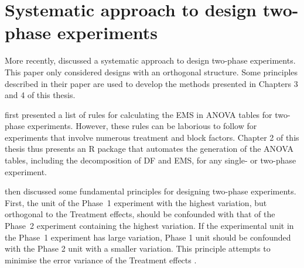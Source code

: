 \section{Systematic approach to design two-phase experiments}
\label{sec:brien2011}
More recently, \cite{Brien2011} discussed a systematic approach to design two-phase experiments. This paper only considered designs with an orthogonal structure. Some principles described in their paper are used to develop the methods presented in Chapters 3 and 4 of this thesis. 

\cite{Brien2011} first presented a list of rules for calculating the EMS in ANOVA tables for two-phase experiments. However, these rules can be laborious to follow for experiments that involve numerous treatment and block factors. Chapter 2 of this thesis thus presents an \textsf{R} package that automates the generation of the ANOVA tables, including the decomposition of DF and EMS, for any single- or two-phase experiment. 

\cite{Brien2011} then discussed some fundamental principles for designing two-phase experiments. First, the unit of the Phase~1 experiment with the highest variation, but orthogonal to the Treatment effects, should be confounded with that of the Phase~2 experiment containing the highest variation. If the experimental unit in the Phase~1 experiment has large variation, Phase 1 unit should be confounded with the Phase 2 unit with a smaller variation. This principle attempts to minimise the error variance of the Treatment effects \citep{Brien2011}. 


